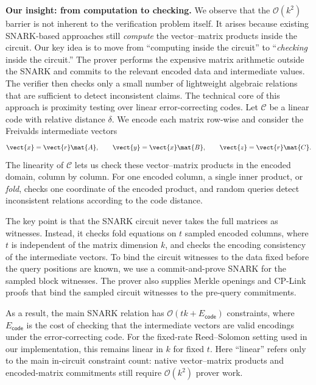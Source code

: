 \noindent\textbf{Our insight: from computation to checking.}
We observe that the \(\mathcal{O}(k^2)\) barrier is not inherent to the
verification problem itself.  It arises because existing SNARK-based approaches
still \emph{compute} the vector--matrix products inside the circuit.  Our key
idea is to move from ``computing inside the circuit'' to ``\emph{checking} inside the
circuit.''  The prover performs the expensive matrix arithmetic outside the
SNARK and commits to the relevant encoded data and intermediate values.  The
verifier then checks only a small number of lightweight algebraic relations
that are sufficient to detect inconsistent claims.
The technical core of this approach is proximity testing over linear
error-correcting codes.  Let \(\mathcal{C}\) be a linear code with relative
distance \(\delta\).  We encode each matrix row-wise and consider the Freivalds
intermediate vectors
\[
  \vect{x}=\vect{r}\mat{A},\qquad
  \vect{y}=\vect{x}\mat{B},\qquad
  \vect{z}=\vect{r}\mat{C}.
\]
The linearity of \(\mathcal{C}\) lets us check these vector--matrix products in
the encoded domain, column by column.  For one encoded column, a single inner
product, or \emph{fold}, checks one coordinate of the encoded product, and
random queries detect inconsistent relations according to the code distance.

The key point is that the SNARK circuit never takes the full matrices as
witnesses.  Instead, it checks fold equations on \(t\) sampled encoded columns,
where \(t\) is independent of the matrix dimension \(k\), and checks the
encoding consistency of the intermediate vectors.
To bind the circuit witnesses to the data fixed before the query positions are known,
we use a commit-and-prove SNARK for the sampled block witnesses.  The prover
also supplies Merkle openings and CP-Link proofs that bind the sampled circuit
witnesses to the pre-query commitments.


As a result, the main SNARK relation has
\(\mathcal{O}(tk+E_{\mathsf{code}})\) constraints, where
\(E_{\mathsf{code}}\) is the cost of checking that the
intermediate vectors are valid encodings under the error-correcting code. For the fixed-rate Reed--Solomon setting used in our implementation,
this remains linear in \(k\) for fixed \(t\).  Here ``linear'' refers only to
the main in-circuit constraint count: native vector--matrix products and
encoded-matrix commitments still require \(\mathcal{O}(k^2)\) prover work.\\


